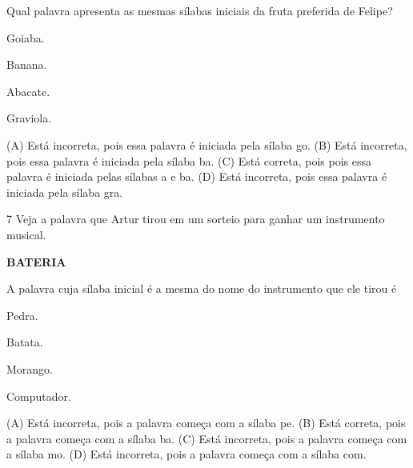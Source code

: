 
Qual palavra apresenta as mesmas sílabas iniciais da fruta preferida de Felipe?

\begin{minipage}{.5\textwidth}
\begin{escolha}
\item Goiaba.

\item Banana.

\item Abacate.

\item Graviola.
\end{escolha}
\end{minipage}

(A) Está incorreta, pois essa palavra é iniciada pela sílaba go.
(B) Está incorreta, pois essa palavra é iniciada pela sílaba ba.
(C) Está correta, pois pois essa palavra é iniciada pelas sílabas a e ba.
(D) Está incorreta, pois essa palavra é iniciada pela sílaba gra.

\num{7} Veja a palavra que Artur tirou em um sorteio para ganhar um instrumento musical.

\textbf{BATERIA}

A palavra cuja sílaba inicial é a mesma do nome do instrumento que ele tirou é

\begin{minipage}{.5\textwidth}
\begin{escolha}
\item Pedra.

\item Batata.

\item Morango.

\item Computador.
\end{escolha}
\end{minipage}

(A) Está incorreta, pois a palavra começa com a sílaba pe.
(B) Está correta, pois a palavra começa com a sílaba ba.
(C) Está incorreta, pois a palavra começa com a sílaba mo.
(D) Está incorreta, pois a palavra começa com a sílaba com.


